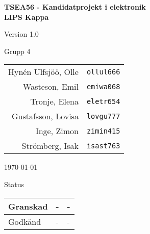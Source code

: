 \documentclass[11pt]{article}
\begin{document}
\begin{titlepage}
\begin{center}

{\Large\bfseries TSEA56 - Kandidatprojekt i elektronik \\ LIPS Kappa}

\vspace{5em}

Version 1.0

\vspace{5em}
Grupp 4 \\
\begin{tabular}{rl}
Hynén Ulfsjöö, Olle&\verb+ollul666+
\\
Wasteson, Emil&\verb+emiwa068+
\\
Tronje, Elena&\verb+eletr654+
\\
Gustafsson, Lovisa&\verb+lovgu777+
\\
Inge, Zimon&\verb+zimin415+
\\
Strömberg, Isak&\verb+isast763+
\\
\end{tabular}

\vspace{5em}
\today

\vspace{16em}
Status
\begin{longtable}{|l|l|l|} \hline

Granskad & - & - \\ \hline
Godkänd & - & - \\ \hline
 
\end{longtable}

\end{center}
\end{titlepage}
\end{document}
